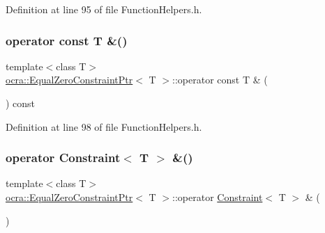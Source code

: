 Definition at line 95 of file Function\+Helpers.\+h.

\hypertarget{classocra_1_1EqualZeroConstraintPtr_a19b57497dcdc5241f3f0980bc6ed93e8}{}\label{classocra_1_1EqualZeroConstraintPtr_a19b57497dcdc5241f3f0980bc6ed93e8} 
\subsubsection{\texorpdfstring{operator const T \&()}{operator const T \&()}}
{\footnotesize\ttfamily template$<$class T$>$ \\
\hyperlink{classocra_1_1EqualZeroConstraintPtr}{ocra\+::\+Equal\+Zero\+Constraint\+Ptr}$<$ T $>$\+::operator const T \& (\begin{DoxyParamCaption}{ }\end{DoxyParamCaption}) const\hspace{0.3cm}{\ttfamily [inline]}}



Definition at line 98 of file Function\+Helpers.\+h.

\hypertarget{classocra_1_1EqualZeroConstraintPtr_a46f26ad15e3bccb5d1566873f7389e5c}{}\label{classocra_1_1EqualZeroConstraintPtr_a46f26ad15e3bccb5d1566873f7389e5c} 
\subsubsection{\texorpdfstring{operator Constraint$<$ T $>$ \&()}{operator Constraint< T > \&()}}
{\footnotesize\ttfamily template$<$class T$>$ \\
\hyperlink{classocra_1_1EqualZeroConstraintPtr}{ocra\+::\+Equal\+Zero\+Constraint\+Ptr}$<$ T $>$\+::operator \hyperlink{classocra_1_1Constraint}{Constraint}$<$ T $>$ \& (\begin{DoxyParamCaption}{ }\end{DoxyParamCaption})\hspace{0.3cm}{\ttfamily [inline]}}



